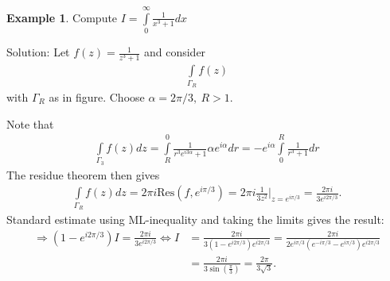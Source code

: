 \documentclass[12pt, a4paper]{article}
\theoremstyle{plain}
\theoremstyle{definition}
\newtheorem{example}{Example} %
\begin{document}
			\begin{example}
				Compute $\displaystyle I= \int\limits_{0}^{\infty} \frac{1}{x^3+1}dx$

				\begin{multicols}{2}
					Solution: Let $\displaystyle f(z) = \frac{1}{z^3+1}$ and consider 
					\begin{align*}
						\int\limits_{\Gamma_R}f(z)
					\end{align*}
					with $\Gamma_R$ as in figure. Choose $\alpha=2\pi/3,\:R>1$.
					\begin{figure}[H]
					\centering
					\end{figure}
				\end{multicols}
				Note that
				\begin{align*}
					\int\limits_{\Gamma_3}f(z)dz = 
					\int\limits_{R}^{0}\frac{1}{r^3e^{i3\alpha}+1}\alpha e^{i\alpha}dr =
					-e^{i\alpha}\int\limits_{0}^{R}\frac{1}{r^3+1}dr
				\end{align*}
				The residue theorem then gives
				\begin{align*}
					\int\limits_{\Gamma_R}f(z)dz = 
					2\pi i \mathrm{Res}(f,e^{i\pi/3}) =
					2\pi i \frac{1}{3z^2}\Bigg|_{z=e^{i\pi/3}} =
					\frac{2\pi i}{3e^{i2\pi/3}}.
				\end{align*}
				Standard estimate using ML-inequality and taking the limits gives the result:
				\begin{align*}
					\Rightarrow (1-e^{i2\pi/3})I =
					\frac{2\pi i}{3e^{i2\pi/3}} \iff
					I &= \frac{2\pi i}{3(1-e^{i2\pi/3})e^{i2\pi/3}} = 
					\frac{2\pi i}{2e^{i\pi/3}(e^{-i\pi/3}-e^{i\pi/3})e^{i2\pi/3}} \\ &=
					\frac{2\pi i}{3\sin(\frac{\pi}{3})} = \frac{2\pi}{3\sqrt{3}}.
				\end{align*}
			\end{example}
\end{document}
